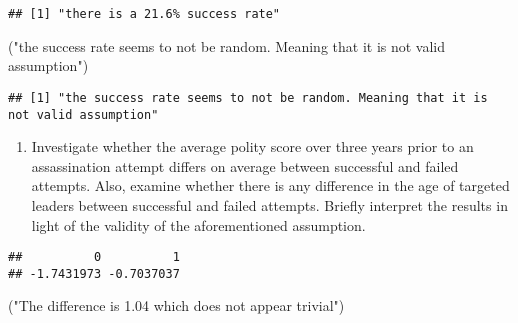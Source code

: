 \documentclass[
]{article}
\newenvironment{Shaded}{\begin{snugshade}}{\end{snugshade}}
\newcommand{\KeywordTok}[1]{\textcolor[rgb]{0.13,0.29,0.53}{\textbf{#1}}}
\newcommand{\NormalTok}[1]{#1}
\newcommand{\OperatorTok}[1]{\textcolor[rgb]{0.81,0.36,0.00}{\textbf{#1}}}
\newcommand{\StringTok}[1]{\textcolor[rgb]{0.31,0.60,0.02}{#1}}
\providecommand{\tightlist}{%
  \setlength{\itemsep}{0pt}\setlength{\parskip}{0pt}}
\begin{document}
\begin{Shaded}
\end{Shaded}

\begin{verbatim}
## [1] "there is a 21.6% success rate"
\end{verbatim}

\begin{Shaded}
\begin{Highlighting}[]
\NormalTok{(}\StringTok{"the success rate seems to not be random. Meaning that it is not valid assumption"}\NormalTok{)}
\end{Highlighting}
\end{Shaded}

\begin{verbatim}
## [1] "the success rate seems to not be random. Meaning that it is not valid assumption"
\end{verbatim}

\begin{enumerate}
\def\labelenumi{\arabic{enumi}.}
\setcounter{enumi}{2}
\tightlist
\item
  Investigate whether the average polity score over three years prior to
  an assassination attempt differs on average between successful and
  failed attempts. Also, examine whether there is any difference in the
  age of targeted leaders between successful and failed attempts.
  Briefly interpret the results in light of the validity of the
  aforementioned assumption.
\end{enumerate}

\begin{Shaded}
\end{Shaded}

\begin{verbatim}
##          0          1 
## -1.7431973 -0.7037037
\end{verbatim}

\begin{Shaded}
\begin{Highlighting}[]
\NormalTok{(}\StringTok{"The difference is 1.04 which does not appear trivial"}\NormalTok{)}
\end{Highlighting}
\end{Shaded}
\end{document}
